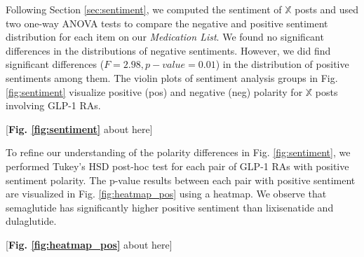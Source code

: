 \documentclass[referee,bst/sn-basic]{sn-jnl}%
\begin{document}
Following Section \ref{sec:sentiment}, we computed the sentiment of $\mathbb{X}$ posts and used two one-way ANOVA tests to compare the negative and positive sentiment distribution for each item on our \textit{Medication List}. 
We found no significant differences in the distributions of negative sentiments. 
However, we did find significant differences ($F = 2.98, p-value= 0.01$) in the distribution of positive sentiments among them.
The violin plots of sentiment analysis groups in Fig. \ref{fig:sentiment} visualize positive (pos) and negative (neg) polarity for $\mathbb{X}$ posts involving GLP-1 RAs. 

\begin{center}
    [\textbf{Fig. \ref{fig:sentiment}} about here]
\end{center}

\begin{comment}
 \begin{figure}[H]
    \centering
    \texttt{[image: images/tukey\_hsd\_plot\_Twitter.pdf]}
    \caption{Sentiment analysis violin plots of positive and negative polarity groups for $\mathbb{X}$ posts with combined generic and brand names of GLP-1 RAs.
    }
    \label{fig:sentiment}
\end{figure}
\end{comment}

To refine our understanding of the polarity differences in Fig. \ref{fig:sentiment}, we performed Tukey's HSD post-hoc test for each pair of GLP-1 RAs with positive sentiment polarity. 
The p-value results between each pair with positive sentiment are visualized in Fig. \ref{fig:heatmap_pos} using a heatmap.
We observe that semaglutide has significantly higher positive sentiment than lixisenatide and dulaglutide.

\begin{center}
    [\textbf{Fig. \ref{fig:heatmap_pos}} about here]
\end{center}


\begin{comment}
 \begin{figure}[H]
    \centering
    \texttt{[image: images/tukey\_hearmap\_positive\_x.pdf]}
    \caption{Heatmap visualizing the p-value results of Tukey’s HSD post-hoc test.}
    \label{fig:heatmap_pos}
\end{figure}
\end{comment}

\end{document}
